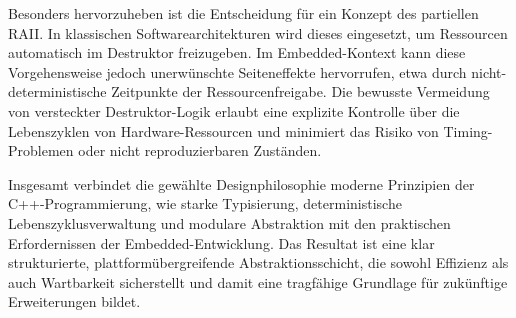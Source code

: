 Besonders hervorzuheben ist die Entscheidung für ein Konzept des partiellen RAII. 
In klassischen Softwarearchitekturen wird dieses eingesetzt, um Ressourcen automatisch im Destruktor freizugeben. 
Im Embedded-Kontext kann diese Vorgehensweise jedoch unerwünschte Seiteneffekte hervorrufen, etwa durch nicht-deterministische Zeitpunkte der Ressourcenfreigabe. 
Die bewusste Vermeidung von versteckter Destruktor-Logik erlaubt eine explizite Kontrolle über die Lebenszyklen von Hardware-Ressourcen und minimiert das Risiko von Timing-Problemen oder nicht reproduzierbaren Zuständen.

Insgesamt verbindet die gewählte Designphilosophie moderne Prinzipien der C++-Programmierung, wie starke Typisierung, deterministische Lebenszyklusverwaltung und modulare Abstraktion mit den praktischen Erfordernissen der Embedded-Entwicklung. 
Das Resultat ist eine klar strukturierte, plattformübergreifende Abstraktionsschicht, die sowohl Effizienz als auch Wartbarkeit sicherstellt und damit eine tragfähige Grundlage für zukünftige Erweiterungen bildet.



































